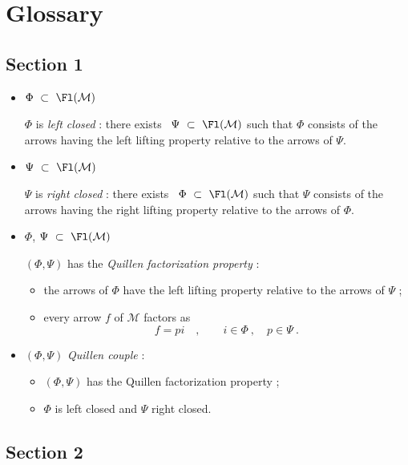 \clearpage


\setcounter{footnote}{0}
\renewcommand{\thefootnote}{\fnsymbol{footnote}}
\section*{Glossary}

\subsection*{Section 1}

\begin{itemize}
\item $\Phi \ \subset\ \Fl(\mathcal{M})$

$\Phi$ is \textit{left closed} : there exists \ $\Psi \ \subset\ \Fl(\mathcal{M})$ such that $\Phi$ consists of the arrows having the left lifting property relative to the arrows of $\Psi$.

\item $\Psi \ \subset\ \Fl(\mathcal{M})$

$\Psi$ is \textit{right closed} : there exists \ $\Phi \ \subset\ \Fl(\mathcal{M})$ such that $\Psi$ consists of the arrows having the right lifting property relative to the arrows of $\Phi$.

\item $\Phi$, $\Psi \ \subset\ \Fl(\mathcal{M})$

$(\Phi, \Psi)$ has the \textit{Quillen factorization property} :
\begin{itemize}
\item[a)] the arrows of $\Phi$ have the left lifting property relative to the arrows of $\Psi$ ;
\item[b)] every arrow $f$ of $\mathcal{M}$ factors as
\[
f = pi \quad , \qquad i \in \Phi \ , \quad p \in \Psi \ .
\]
\end{itemize}

\item $(\Phi, \Psi)$ \textit{Quillen couple} :
\begin{itemize}
\item[a)] $(\Phi, \Psi)$ has the Quillen factorization property ;
\item[b)] $\Phi$ is left closed and $\Psi$ right closed.
\end{itemize}
\end{itemize}

\subsection*{Section 2}

